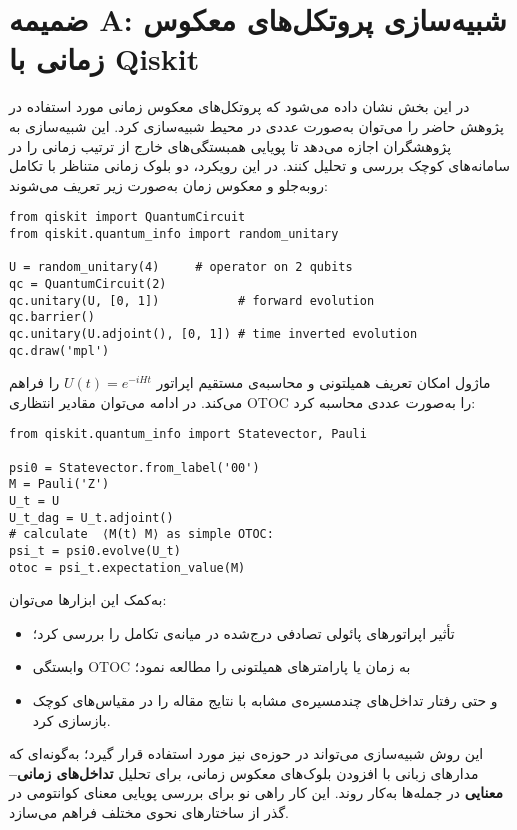 \appendix
\section*{ضمیمه A: شبیه‌سازی پروتکل‌های معکوس زمانی با Qiskit}
\label{sec:qiskit-appendix}

در این بخش نشان داده می‌شود که پروتکل‌های معکوس زمانی مورد استفاده در پژوهش حاضر را می‌توان به‌صورت عددی در محیط  شبیه‌سازی کرد. این شبیه‌سازی به پژوهشگران اجازه می‌دهد تا پویایی همبستگی‌های خارج از ترتیب زمانی را در سامانه‌های کوچک بررسی و تحلیل کنند.
در این رویکرد، دو بلوک زمانی متناظر با تکامل روبه‌جلو و معکوس زمان به‌صورت زیر تعریف می‌شوند:
\begin{center}
	\begin{LTR}
		\begin{verbatim}
from qiskit import QuantumCircuit
from qiskit.quantum_info import random_unitary

U = random_unitary(4)     # operator on 2 qubits
qc = QuantumCircuit(2)
qc.unitary(U, [0, 1])           # forward evolution
qc.barrier()
qc.unitary(U.adjoint(), [0, 1]) # time inverted evolution
qc.draw('mpl')
\end{verbatim}
\end{LTR}
\end{center}
ماژول  امکان تعریف همیلتونی و محاسبه‌ی مستقیم اپراتور \( U(t)=e^{-iHt} \) را فراهم می‌کند.  
در ادامه می‌توان مقادیر انتظاری OTOC را به‌صورت عددی محاسبه کرد:
\begin{center}
	\begin{LTR}
		\begin{verbatim}
from qiskit.quantum_info import Statevector, Pauli

psi0 = Statevector.from_label('00')
M = Pauli('Z')
U_t = U
U_t_dag = U_t.adjoint()
# calculate  ⟨M(t) M⟩ as simple OTOC: 
psi_t = psi0.evolve(U_t)
otoc = psi_t.expectation_value(M)
\end{verbatim}
\end{LTR}
\end{center}

به‌کمک این ابزارها می‌توان:
\begin{itemize}
	\item تأثیر اپراتورهای پائولی تصادفی درج‌شده در میانه‌ی تکامل را بررسی کرد؛
	\item وابستگی OTOC به زمان یا پارامترهای همیلتونی را مطالعه نمود؛
	\item و حتی رفتار تداخل‌های چندمسیره‌ی مشابه با نتایج مقاله را در مقیاس‌های کوچک بازسازی کرد.
\end{itemize}

این روش شبیه‌سازی می‌تواند در حوزه‌ی  نیز مورد استفاده قرار گیرد؛ به‌گونه‌ای که مدارهای زبانی  با افزودن بلوک‌های معکوس زمانی، برای تحلیل \textbf{تداخل‌های زمانی–معنایی} در جمله‌ها به‌کار روند. این کار راهی نو برای بررسی پویایی معنای کوانتومی در گذر از ساختارهای نحوی مختلف فراهم می‌سازد.
